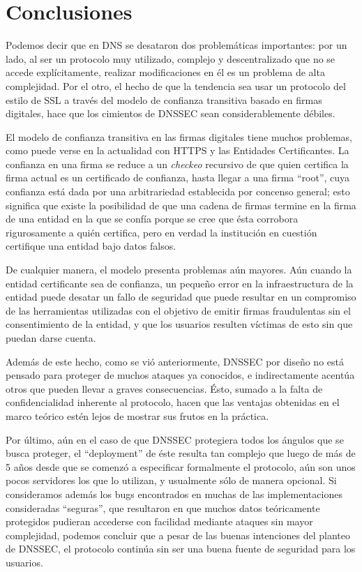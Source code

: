 \chapter{Conclusiones}
Podemos decir que en DNS se desataron dos problem\'aticas importantes: por un lado, al ser un protocolo muy utilizado, complejo y descentralizado que no se accede expl\'icitamente, realizar modificaciones en \'el es un problema de alta complejidad. Por el otro, el hecho de que la tendencia sea usar un protocolo del estilo de SSL a trav\'es del modelo de confianza transitiva basado en firmas digitales, hace que los cimientos de DNSSEC sean considerablemente d\'ebiles.

El modelo de confianza transitiva en las firmas digitales tiene muchos problemas, como puede verse en la actualidad con HTTPS y las Entidades Certificantes. La confianza en una firma se reduce a un \textit{checkeo} recursivo de que quien certifica la firma actual es un certificado de confianza, hasta llegar a una firma ``root'', cuya confianza est\'a dada por una arbitrariedad establecida por concenso general; esto significa que existe la posibilidad de que una cadena de firmas termine en la firma de una entidad en la que se conf\'ia porque se cree que \'esta corrobora rigurosamente a qui\'en certifica, pero en verdad la instituci\'on en cuesti\'on certifique una entidad bajo datos falsos.

De cualquier manera, el modelo presenta problemas a\'un mayores. A\'un cuando la entidad certificante sea de confianza, un peque\~no error en la infraestructura de la entidad puede desatar un fallo de seguridad que puede resultar en un compromiso de las herramientas utilizadas con el objetivo de emitir firmas fraudulentas sin el consentimiento de la entidad, y que los usuarios resulten v\'ictimas de esto sin que puedan darse cuenta.

Adem\'as de este hecho, como se vi\'o anteriormente, DNSSEC por dise\~no no est\'a pensado para proteger de muchos ataques ya conocidos, e indirectamente acent\'ua otros que pueden llevar a graves consecuencias. \'Esto, sumado a la falta de confidencialidad inherente al protocolo, hacen que las ventajas obtenidas en el marco te\'orico est\'en lejos de mostrar sus frutos en la pr\'actica.

Por \'ultimo, a\'un en el caso de que DNSSEC protegiera todos los \'angulos que se busca proteger, el ``deployment'' de \'este resulta tan complejo que luego de m\'as de 5 a\~nos desde que se comenz\'o a especificar formalmente el protocolo, a\'un son unos pocos servidores los que lo utilizan, y usualmente s\'olo de manera opcional. Si consideramos adem\'as los bugs encontrados en muchas de las implementaciones consideradas ``seguras'', que resultaron en que muchos datos te\'oricamente protegidos pudieran accederse con facilidad mediante ataques sin mayor complejidad, podemos concluir que a pesar de las buenas intenciones del planteo de DNSSEC, el protocolo contin\'ua sin ser una buena fuente de seguridad para los usuarios.
